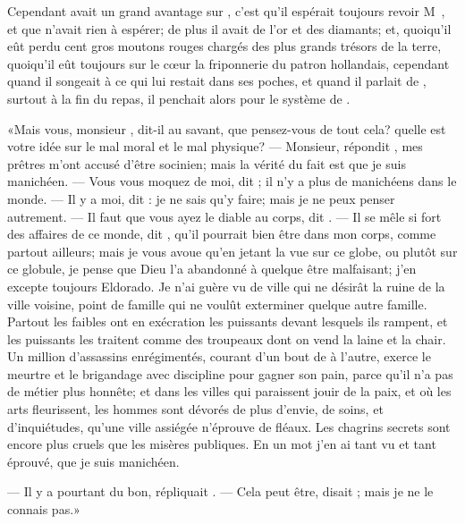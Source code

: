 Cependant  avait un grand avantage sur , c’est qu’il
espérait toujours revoir M~, et que  n’avait
rien à espérer; de plus il avait de l’or et des diamants; et, quoiqu’il
eût perdu cent gros moutons rouges chargés des plus grands trésors de
la terre, quoiqu’il eût toujours sur le cœur la friponnerie du patron
hollandais, cependant quand il songeait à ce qui lui restait dans ses
poches, et quand il parlait de , surtout à la fin du repas, il
penchait alors pour le système de .


«Mais vous, monsieur , dit-il au savant, que pensez-vous de tout
cela? quelle est votre idée sur le mal moral et le mal physique?
— Monsieur, répondit , mes prêtres m’ont accusé d’être socinien;
mais la vérité du fait est que je suis manichéen. — Vous vous moquez
de moi, dit ; il n’y a plus de manichéens dans le monde. — Il y a
moi, dit : je ne sais qu’y faire; mais je ne peux penser
autrement. — Il faut que vous ayez le diable au corps, dit . — Il se
mêle si fort des affaires de ce monde, dit , qu’il pourrait bien
être dans mon corps, comme partout ailleurs; mais je vous avoue qu’en
jetant la vue sur ce globe, ou plutôt sur ce globule, je pense que Dieu
l’a abandonné à quelque être malfaisant; j’en excepte toujours
Eldorado. Je n’ai guère vu de ville qui ne désirât la ruine de la ville
voisine, point de famille qui ne voulût exterminer quelque autre
famille. Partout les faibles ont en exécration les puissants devant
lesquels ils rampent, et les puissants les traitent comme des troupeaux
dont on vend la laine et la chair. Un million d’assassins enrégimentés,
courant d’un bout de  à
 l’autre, exerce le meurtre et le
brigandage avec discipline pour gagner son pain, parce qu’il n’a pas de
métier plus honnête; et dans les villes qui paraissent jouir de la
paix, et où les arts fleurissent, les hommes sont dévorés de plus
d’envie, de soins, et d’inquiétudes, qu’une ville assiégée n’éprouve de
fléaux. Les chagrins secrets sont encore plus cruels que les misères
publiques. En un mot j’en ai tant vu et tant éprouvé, que \linebreak je suis
manichéen.



— Il y a pourtant du bon, répliquait . — Cela peut être, disait
; mais je ne le connais pas.»




